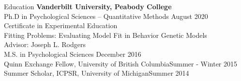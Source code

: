 \begin{rSection}{\textrm{Education}}
{\bf Vanderbilt University, Peabody College}\\
Ph.D in Psychological Sciences -- Quantitative Methods \hfill{August 2020}\\%
\hspace*{\pindent}Certificate in Experimental Education\\%
\hspace*{\pindent}Fitting Problems: Evaluating Model Fit in Behavior Genetic Models\\
\hspace*{\pindent}Advisor: Joseph L. Rodgers%
\smallskip\\
M.S. in Psychological Sciences \hfill{December 2016} \\
\hspace*{\pindent}Quinn Exchange Fellow, University of British Columbia\hfill{Summer - Winter 2015}\\
\hspace*{\pindent}Summer Scholar, ICPSR, University of Michigan\hfill{Summer 2014}%
\medskip\\
\begin{comment}
\textbf{University of British Columbia}\\
Visiting International Researcher \& Quinn Exchange Fellow\hfill{Summer - Winter 2015}\\
\hspace*{\pindent}Department of Psychology\\
\hspace*{\pindent}Sponsor: Jeremy C. Biesanz \& Anita DeLongis\medskip\\
\textbf{University of Michigan, Ann Arbor}\\

\end{comment}
\end{rSection}
